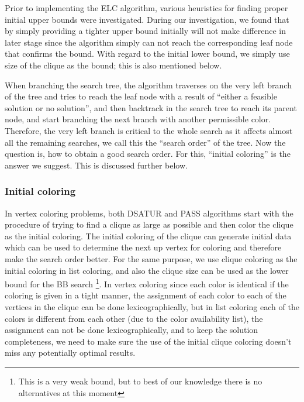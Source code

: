 \documentclass[10pt]{article}
\begin{document}
Prior to implementing the
ELC algorithm, various heuristics for finding proper initial upper
bounds were investigated. During our investigation, we found that by
simply providing a tighter upper bound initially will not make difference 
in later stage since the algorithm simply can not reach the corresponding
leaf node that confirms the bound. With regard to the initial lower bound, we simply
use size of the clique as the bound; this is also mentioned below. 

When branching the search tree, the algorithm traverses on the very left branch of 
the tree and tries to reach the leaf node with a result of ``either a feasible solution or
no solution'', and then backtrack in the search tree to reach its parent node,
and start branching the next branch with another permissible color. Therefore, the very left
branch is critical to the whole search as it affects almost all the remaining searches, we call this the ``search order'' of the tree. Now the question is, how to obtain a good search order. For this, ``initial coloring'' is the answer we suggest. This is discussed further below.   

\subsubsection{Initial coloring}

In vertex coloring problems, both DSATUR\cite{Bre79} and PASS algorithms \cite{PASS} start
with the procedure of trying to find a clique as large as possible and then color the clique as the initial
coloring. The initial coloring of the clique can generate initial data which can be used to determine the next 
up vertex for coloring and therefore make the search order better. For the same purpose, we use clique coloring
as the initial coloring in list coloring, and also the clique size can be used as the lower bound for the BB search \footnote{This is a very weak bound, but to best of our knowledge there is no alternatives at this moment}. In vertex coloring since 
each color is identical if the coloring is given in a tight manner, the assignment of each color 
to each of the vertices in the clique can be done lexicographically, but in list coloring
each of the colors is different from each other (due to the color availability list), the assignment can
not be done lexicographically, and to keep the solution completeness, we need to make sure 
the use of the initial clique coloring doesn't miss any potentially optimal results.  
\end{document}

